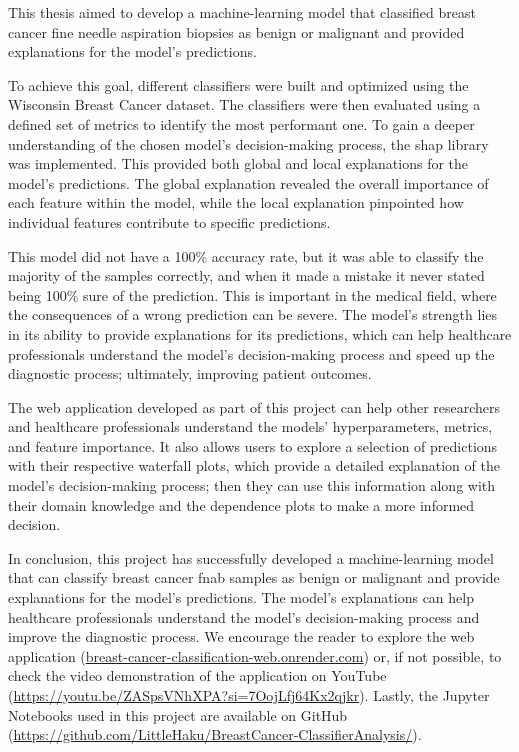 This thesis aimed to develop a machine-learning model that classified breast cancer fine needle aspiration biopsies as benign or malignant and provided explanations for the model's predictions.

To achieve this goal, different classifiers were built and optimized using the Wisconsin Breast Cancer dataset. The classifiers were then evaluated using a defined set of metrics to identify the most performant one. To gain a deeper understanding of the chosen model's decision-making process, the \ac{shap} library was implemented. This provided both global and local explanations for the model's predictions. The global explanation revealed the overall importance of each feature within the model, while the local explanation pinpointed how individual features contribute to specific predictions.

This model did not have a 100\% accuracy rate, but it was able to classify the majority of the samples correctly, and when it made a mistake it never stated being 100\% sure of the prediction. This is important in the medical field, where the consequences of a wrong prediction can be severe. The model's strength lies in its ability to provide explanations for its predictions, which can help healthcare professionals understand the model's decision-making process and speed up the diagnostic process; ultimately, improving patient outcomes.

The web application developed as part of this project can help other researchers and healthcare professionals understand the models' hyperparameters, metrics, and feature importance. It also allows users to explore a selection of predictions with their respective waterfall plots, which provide a detailed explanation of the model's decision-making process; then they can use this information along with their domain knowledge and the dependence plots to make a more informed decision.

In conclusion, this project has successfully developed a machine-learning model that can classify breast cancer \acl{fnab} samples as benign or malignant and provide explanations for the model's predictions. The model's explanations can help healthcare professionals understand the model's decision-making process and improve the diagnostic process. We encourage the reader to explore the web application (\href{breast-cancer-classification-web.onrender.com}{breast-cancer-classification-web.onrender.com}) or, if not possible, to check the video demonstration of the application on YouTube (\href{https://youtu.be/ZASpsVNhXPA?si=7OojLfj64Kx2qjkr}{https://youtu.be/ZASpsVNhXPA?si=7OojLfj64Kx2qjkr}). Lastly, the Jupyter Notebooks used in this project are available on GitHub \\(\href{https://github.com/LittleHaku/BreastCancer-ClassifierAnalysis/}{https://github.com/LittleHaku/BreastCancer-ClassifierAnalysis/}).